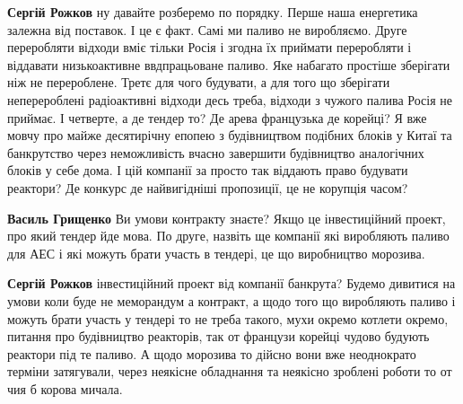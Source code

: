 \begin{itemize}
\begin{itemize}
 
\textbf{Сергій Рожков} ну давайте розберемо по порядку. Перше наша енергетика
залежна від поставок. І це є факт. Самі ми паливо не виробляємо. Друге
переробляти відходи вміє тільки Росія і згодна їх приймати переробляти і
віддавати низькоактивне ввдпрацьоване паливо. Яке набагато простіше зберігати
ніж не перероблене. Третє для чого будувати, а для того що зберігати
неперероблені радіоактивні відходи десь треба, відходи з чужого палива Росія не
приймає. І четверте, а де тендер то? Де арева французька де корейці? Я вже
мовчу про майже десятирічну епопею з будівництвом подібних блоків у Китаї та
банкрутство через неможливість вчасно завершити будівництво аналогічних блоків
у себе дома. І цій компанії за просто так віддають право будувати реактори? Де
конкурс де найвигідніші пропозиції, це не корупція часом?

 
\textbf{Василь Грищенко} Ви умови контракту знаєте? Якщо це інвестиційний проект, про який тендер йде мова. По друге, назвіть ще компанії які виробляють паливо для АЕС і які можуть брати участь в тендері, це що виробництво морозива.

 
\textbf{Сергій Рожков} інвестиційний проект від компанії банкрута? Будемо
дивитися на умови коли буде не меморандум а контракт, а щодо того що виробляють
паливо і можуть брати участь у тендері то не треба такого, мухи окремо котлети
окремо, питання про будівництво реакторів, так от французи корейці чудово
будують реактори під те паливо. А щодо морозива то дійсно вони вже неоднократо
терміни затягували, через неякісне обладнання та неякісно зроблені роботи то от
чия б корова мичала.


\end{itemize}
\end{itemize}

